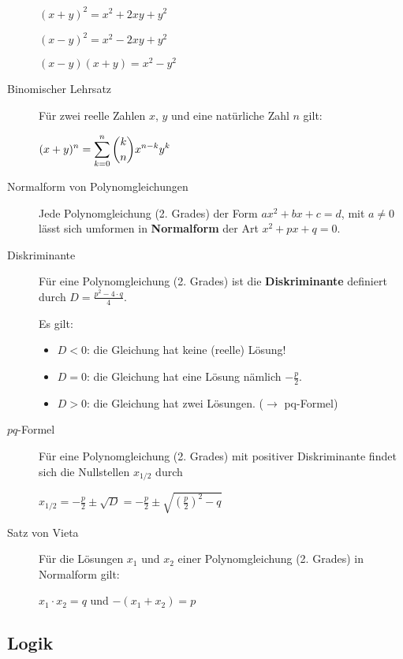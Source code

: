 \documentclass[
  ngerman,
  a4paper,
  landscape, fontsize=9pt, version=first, enabledeprecatedfontcommands,
  DIV=6]{scrartcl}
\providecommand{\tightlist}{%
  \setlength{\itemsep}{0pt}\setlength{\parskip}{0pt}}
\begin{document}
\begin{multicols}{3}
\begin{description}
\(\displaystyle (x+y)^2 = x^2 + 2 xy + y^2\)

\(\displaystyle (x-y)^2 = x^2 - 2 xy + y^2\)

\(\displaystyle (x-y)(x+y) = x^2-y^2\)
\item[Binomischer Lehrsatz]
Für zwei reelle Zahlen \(x\), \(y\) und eine natürliche Zahl \(n\) gilt:

\(\displaystyle (x+y)^n = \sum\limits_{k=0}^{n} \dbinom{k}{n} x^{n-k}y^{k}\)
\item[Normalform von Polynomgleichungen]
Jede Polynomgleichung (2. Grades) der Form \(a x^2+ bx +c = d\), mit
\(a\neq 0\) lässt sich umformen in \textbf{Normalform} der Art
\(x^2+px+q = 0\).
\item[Diskriminante]
Für eine Polynomgleichung (2. Grades) ist die \textbf{Diskriminante}
definiert durch \(D=\frac{p^2-4\cdot q}{4}\).

Es gilt:

\begin{itemize}
\tightlist
\item
  \(D < 0\): die Gleichung hat keine (reelle) Lösung!
\end{itemize}

\begin{itemize}
\tightlist
\item
  \(D = 0\): die Gleichung hat eine Lösung nämlich \(-\frac{p}{2}\).
\end{itemize}

\begin{itemize}
\tightlist
\item
  \(D > 0\): die Gleichung hat zwei Lösungen. (\(\rightarrow\)
  pq-Formel)
\end{itemize}
\item[\(pq\)-Formel]
Für eine Polynomgleichung (2. Grades) mit positiver Diskriminante findet
sich die Nullstellen \(x_{1/2}\) durch

\(\displaystyle x_{1/2} = -\frac{p}{2} \pm \sqrt{D} = -\frac{p}{2} \pm \sqrt{\left(\frac{p}{2}\right)^2 - q}\)
\item[Satz von Vieta]
Für die Lösungen \(x_1\) und \(x_2\) einer Polynomgleichung (2. Grades)
in Normalform gilt:

\(x_1 \cdot x_2 = q\) und \(-(x_1+x_2)=p\)
\end{description}

\hypertarget{logik}{%
\subsection{Logik}\label{logik}}


\end{multicols}
\end{document}

